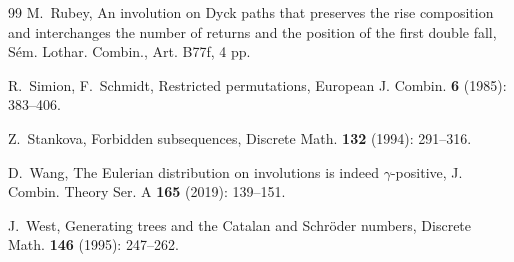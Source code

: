 \documentclass[12pt]{amsart}
\numberwithin{equation}{section}
\theoremstyle{plain}
\theoremstyle{definition}
\begin{document}
\begin{thebibliography}{99}
 M.~Rubey, An involution on Dyck paths that preserves the rise composition and interchanges the number of returns and the position of the first double fall,
S\'em. Lothar. Combin., Art. B77f, 4 pp.

 R.~Simion, F.~Schmidt, Restricted permutations, European J. Combin. {\bf6} (1985): 383--406.

 Z.~Stankova, Forbidden subsequences, Discrete Math. {\bf132} (1994): 291--316.

%

 D.~Wang, The Eulerian distribution on involutions is indeed $\gamma$-positive, J. Combin. Theory Ser. A {\bf165} (2019): 139--151.

 J.~West, Generating trees and the Catalan and Schr\"oder numbers, Discrete Math. {\bf146} (1995): 247--262.

\end{thebibliography}
\end{document}
